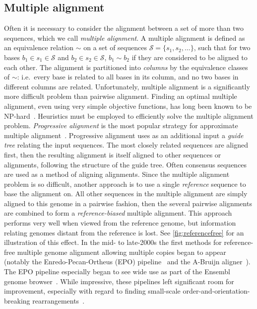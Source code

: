 \documentclass[fleqn,10pt]{wlscirep}
\begin{document}
\subsection{Multiple alignment}
Often it is necessary to consider the alignment between a set of more than two sequences, which we call \emph{multiple alignment}.
A multiple alignment is defined as an equivalence relation $\sim$ on a set of sequences $\mathcal{S} = \{s_1, s_2, \ldots\}$, such that for two bases $b_1 \in s_1 \in \mathcal{S}$ and $b_2 \in s_2 \in \mathcal{S}$, $b_1 \sim b_2$ if they are considered to be aligned to each other.
The alignment is partitioned into \emph{columns} by the equivalence classes of $\sim$: i.e.\ every base is related to all bases in its column, and no two bases in different columns are related.
Unfortunately, multiple alignment is a significantly more difficult problem than pairwise alignment.
Finding an optimal multiple alignment, even using very simple objective functions, has long been known to be NP-hard~\cite{complexityOfMultipleAlignment}.
Heuristics must be employed to efficiently solve the multiple alignment problem.
\emph{Progressive alignment} is the most popular strategy for approximate multiple alignment~\cite{progressiveAlignment}.
Progressive alignment uses as an additional input a \emph{guide tree} relating the input sequences.
The most closely related sequences are aligned first, then the resulting alignment is itself aligned to other sequences or alignments, following the structure of the guide tree. Often consensus sequences are used as a method of aligning alignments.
Since the multiple alignment problem is so difficult, another approach is to use a single \emph{reference} sequence to base the alignment on.
All other sequences in the multiple alignment are simply aligned to this genome in a pairwise fashion, then the several pairwise alignments are combined to form a \emph{reference-biased} multiple alignment.
This approach performs very well when viewed from the reference genome, but information relating genomes distant from the reference is lost. See \ref{fig:referencefree} for an illustration of this effect.
In the mid- to late-2000s the first methods for reference-free multiple genome alignment allowing multiple copies began to appear (notably the Enredo-Pecan-Ortheus (EPO) pipeline~\cite{epo} and the A-Bruijn aligner~\cite{aBruijn}).
The EPO pipeline especially began to see wide use as part of the Ensembl genome browser~\cite{ensembl2017}.
While impressive, these pipelines left significant room for improvement, especially with regard to finding small-scale order-and-orientation-breaking rearrangements~\cite{epo}.
\end{document}
